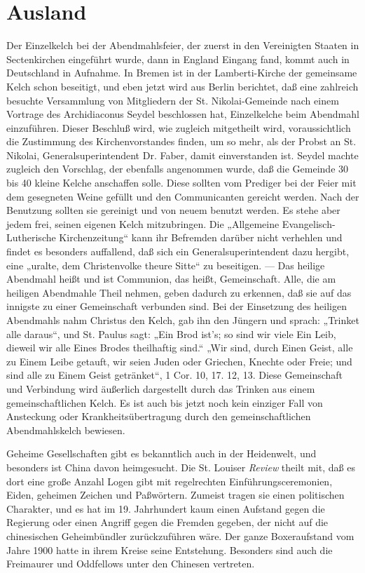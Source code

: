 \section{Ausland}

Der Einzelkelch bei der Abendmahlsfeier, der zuerst in den Vereinigten Staaten in Sectenkirchen eingeführt wurde, dann in England Eingang fand, kommt auch in Deutschland in Aufnahme. In Bremen ist in der Lamberti-Kirche der gemeinsame Kelch schon beseitigt, und eben jetzt wird aus Berlin berichtet, daß eine zahlreich besuchte Versammlung von Mitgliedern der St. Nikolai-Gemeinde nach einem Vortrage des Archidiaconus Seydel beschlossen hat, Einzelkelche beim Abendmahl einzuführen. Dieser Beschluß wird, wie zugleich mitgetheilt wird, voraussichtlich die Zustimmung des Kirchenvorstandes finden, um so mehr, als der Probst an St. Nikolai, Generalsuperintendent Dr. Faber, damit einverstanden ist. Seydel machte zugleich den Vorschlag, der ebenfalls angenommen wurde, daß die Gemeinde 30 bis 40 kleine Kelche anschaffen solle. Diese sollten vom Prediger bei der Feier mit dem gesegneten Weine gefüllt und den Communicanten gereicht werden. Nach der Benutzung sollten sie gereinigt und von neuem benutzt werden. Es stehe aber jedem frei, seinen eigenen Kelch mitzubringen. Die „Allgemeine Evangelisch-Lutherische Kirchenzeitung“ kann ihr Befremden darüber nicht verhehlen und findet es besonders auffallend, daß sich ein Generalsuperintendent dazu hergibt, eine „uralte, dem Christenvolke theure Sitte“ zu beseitigen. — Das
heilige Abendmahl heißt und ist Communion, das heißt, Gemeinschaft. Alle, die am heiligen Abendmahle Theil nehmen, geben dadurch zu erkennen, daß sie auf das innigste zu einer Gemeinschaft verbunden sind. Bei der Einsetzung des heiligen Abendmahls nahm Christus den Kelch, gab ihn den Jüngern und sprach: „Trinket alle daraus“, und St. Paulus sagt: „Ein Brod ist’s; so sind wir viele Ein Leib, dieweil wir alle Eines Brodes theilhaftig sind.“ „Wir sind, durch Einen Geist, alle zu Einem Leibe getauft, wir seien Juden oder Griechen, Knechte oder Freie; und sind alle zu Einem Geist getränket“, 1 Cor. 10, 17. 12, 13. Diese Gemeinschaft und Verbindung wird äußerlich dargestellt durch das Trinken aus einem gemeinschaftlichen Kelch. Es ist auch bis jetzt noch kein einziger Fall von Ansteckung oder Krankheitsübertragung durch den gemeinschaftlichen Abendmahlskelch bewiesen.

Geheime Gesellschaften gibt es bekanntlich auch in der Heidenwelt, und besonders ist China davon heimgesucht. Die St. Louiser \emph{Review} theilt mit, daß es dort eine große Anzahl Logen gibt mit regelrechten Einführungsceremonien, Eiden, geheimen Zeichen und Paßwörtern. Zumeist tragen sie einen politischen Charakter, und es hat im 19. Jahrhundert kaum einen Aufstand gegen die Regierung oder einen Angriff gegen die Fremden gegeben, der nicht auf die chinesischen Geheimbündler zurückzuführen wäre. Der ganze Boxeraufstand vom Jahre 1900 hatte in ihrem Kreise seine Entstehung. Besonders sind auch die Freimaurer und Oddfellows unter den Chinesen vertreten.
